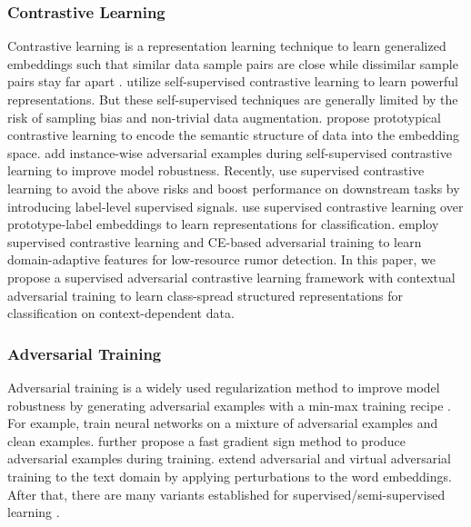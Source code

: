 \documentclass[11pt]{article}
\begin{document}
\subsubsection{Contrastive Learning}
Contrastive learning is a representation learning technique to learn generalized embeddings such that similar data sample pairs are close while dissimilar sample pairs stay far apart \cite{DBLP:conf/cvpr/ChopraHL05}. 
\citet{DBLP:conf/nips/Sohn16,DBLP:journals/corr/abs-1807-03748,DBLP:conf/nips/BachmanHB19,DBLP:conf/eccv/TianKI20,DBLP:conf/icml/Henaff20,DBLP:conf/icml/ChenK0H20} utilize self-supervised contrastive learning to learn powerful representations. But these self-supervised techniques are generally limited by the risk of sampling bias and non-trivial data augmentation.
\citet{DBLP:conf/iclr/0001ZXH21} propose prototypical contrastive learning to encode the semantic structure of data into the embedding space.
\citet{DBLP:conf/nips/KimTH20,DBLP:conf/nips/JiangCCW20,DBLP:conf/nips/FanLCZG21} add instance-wise adversarial examples during self-supervised contrastive learning to improve model robustness.
Recently, \citet{khosla2020supervised,gunel2020supervised} use supervised contrastive learning to avoid the above risks and boost performance on downstream tasks by introducing label-level supervised signals. 
\citet{DBLP:conf/cvpr/00230W0W21,lopez2022supervised} use supervised contrastive learning over prototype-label embeddings to learn representations for classification.
\citet{DBLP:conf/naacl/LinMCYCC22} employ supervised contrastive learning and CE-based adversarial training to learn domain-adaptive features for low-resource rumor detection.
In this paper, we propose a supervised adversarial contrastive learning framework with contextual adversarial training to learn class-spread structured representations for classification on context-dependent data.

\subsubsection{Adversarial Training}
Adversarial training is a widely used regularization 
method to improve model robustness by generating adversarial examples with a min-max training recipe \cite{DBLP:journals/corr/SzegedyZSBEGF13}.
For example,
\citet{DBLP:journals/corr/SzegedyZSBEGF13} train neural networks on a mixture of adversarial examples and clean examples.
\citet{DBLP:journals/corr/GoodfellowSS14} further propose a fast gradient sign method to produce adversarial examples during training.
\citet{DBLP:conf/iclr/MiyatoDG17} extend adversarial and virtual adversarial training to the text domain by applying perturbations to the word embeddings.
After that, there are many variants established for supervised/semi-supervised learning \cite{DBLP:conf/nips/ShafahiNG0DSDTG19,DBLP:conf/nips/ZhangZLZ019,DBLP:conf/nips/QinMGKDFDSK19,DBLP:conf/acl/JiangHCLGZ20,DBLP:conf/iclr/ZhuCGSGL20}.
\end{document}
